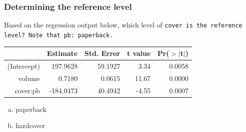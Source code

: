 \documentclass{beamer}
\begin{document}

\begin{frame}
\frametitle{Determining the reference level}

Based on the regression output below, which level of \tt{cover} is the reference level? Note that \tt{pb}: paperback.

{\small
\begin{center}
\begin{tabular}{rrrrr}
  \hline
 & Estimate & Std. Error & t value & Pr($>$$|$t$|$) \\ 
  \hline
(Intercept) & 197.9628 & 59.1927 & 3.34 & 0.0058 \\ 
  volume & 0.7180 & 0.0615 & 11.67 & 0.0000 \\ 
  cover:pb & -184.0473 & 40.4942 & -4.55 & 0.0007 \\ 
   \hline
\end{tabular}
\end{center}
}

\begin{enumerate}[(a)]
\item paperback
\item hardcover
\end{enumerate}

\end{frame}

\end{document}
